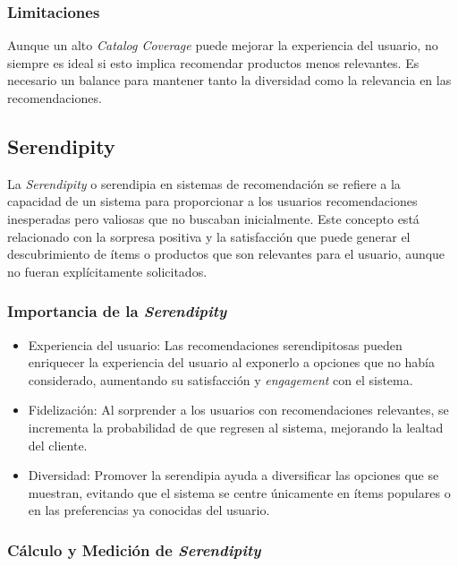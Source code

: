 \documentclass[11pt,a4paper,twoside]{thesis}
\begin{document}
\subsubsection{Limitaciones}

Aunque un alto \textit{Catalog Coverage} puede mejorar la experiencia del usuario, no siempre es ideal si esto implica recomendar productos menos relevantes. Es necesario un balance para mantener tanto la diversidad como la relevancia en las recomendaciones.


\subsection{Serendipity}

La \textit{Serendipity} o serendipia en sistemas de recomendación se refiere a la capacidad de un sistema para proporcionar a los usuarios recomendaciones inesperadas pero valiosas que no buscaban inicialmente. Este concepto está relacionado con la sorpresa positiva y la satisfacción que puede generar el descubrimiento de ítems o productos que son relevantes para el usuario, aunque no fueran explícitamente solicitados.

\subsubsection*{Importancia de la \textit{Serendipity}}

\begin{itemize}
	\item Experiencia del usuario: Las recomendaciones serendipitosas pueden enriquecer la experiencia del usuario al exponerlo a opciones que no había considerado, aumentando su satisfacción y \textit{engagement} con el sistema.
	\item Fidelización: Al sorprender a los usuarios con recomendaciones relevantes, se incrementa la probabilidad de que regresen al sistema, mejorando la lealtad del cliente.
	\item Diversidad: Promover la serendipia ayuda a diversificar las opciones que se muestran, evitando que el sistema se centre únicamente en ítems populares o en las preferencias ya conocidas del usuario.
\end{itemize}

\subsubsection*{Cálculo y Medición de \textit{Serendipity}}
\end{document}
